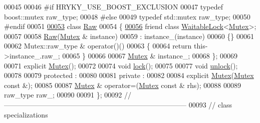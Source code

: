 \begin{DoxyCode}
00045 
00046 \textcolor{preprocessor}{#if HRYKY\_USE\_BOOST\_EXCLUSION}
00047 \textcolor{preprocessor}{}    \textcolor{keyword}{typedef} boost::mutex    raw\_type;
00048 \textcolor{preprocessor}{#else}
00049 \textcolor{preprocessor}{}    \textcolor{keyword}{typedef} std::mutex      raw\_type;
00050 \textcolor{preprocessor}{#endif}
00051 \textcolor{preprocessor}{}
\hypertarget{exclusion__mutex_8h_source_l00053}{}\hyperlink{classhryky_1_1exclusion_1_1_mutex_1_1_raw}{00053}     \textcolor{keyword}{class }\hyperlink{classhryky_1_1exclusion_1_1_mutex_1_1_raw}{Raw}
00054     \{
\hypertarget{exclusion__mutex_8h_source_l00056}{}\hyperlink{classhryky_1_1exclusion_1_1_mutex_1_1_raw_adf91eea431cc875373b8a697c1b9b577}{00056}         \textcolor{keyword}{friend} \textcolor{keyword}{class }\hyperlink{classhryky_1_1exclusion_1_1_waitable_lock}{WaitableLock}<\hyperlink{classhryky_1_1exclusion_1_1_mutex}{Mutex}>;
00057         
00058         \hyperlink{classhryky_1_1exclusion_1_1_mutex_1_1_raw}{Raw}(\hyperlink{classhryky_1_1exclusion_1_1_mutex}{Mutex} & instance)
00059             : instance\_(instance)
00060         \{\}
00061         
00062         Mutex::raw\_type & operator()()
00063         \{
00064             \textcolor{keywordflow}{return} this->instance\_.raw\_;
00065         \}
00066         
00067         \hyperlink{classhryky_1_1exclusion_1_1_mutex}{Mutex} & instance\_;
00068     \};
00069 
00071     \textcolor{keyword}{explicit} \hyperlink{classhryky_1_1exclusion_1_1_mutex_a63cb7e8e5bae0963b1ab3c2712176635}{Mutex}();
00072 
00074     \textcolor{keywordtype}{void} \hyperlink{classhryky_1_1exclusion_1_1_mutex_a6e730d19ff5246bc17ee2ad9f9ae184e}{lock}();
00075 
00077     \textcolor{keywordtype}{void} \hyperlink{classhryky_1_1exclusion_1_1_mutex_a62db408cfde1885ad96dc20f8ed3850a}{unlock}();
00078 
00079 \textcolor{keyword}{protected} :
00080 
00081 \textcolor{keyword}{private} :
00082 
00084     \textcolor{keyword}{explicit} \hyperlink{classhryky_1_1exclusion_1_1_mutex_a63cb7e8e5bae0963b1ab3c2712176635}{Mutex}(\hyperlink{classhryky_1_1exclusion_1_1_mutex_a63cb7e8e5bae0963b1ab3c2712176635}{Mutex} \textcolor{keyword}{const} &);
00085 
00087     \hyperlink{classhryky_1_1exclusion_1_1_mutex_a63cb7e8e5bae0963b1ab3c2712176635}{Mutex} & operator=(\hyperlink{classhryky_1_1exclusion_1_1_mutex_a63cb7e8e5bae0963b1ab3c2712176635}{Mutex} \textcolor{keyword}{const} & rhs);
00088 
00089     raw\_type    raw\_;
00090 
00091 \};
00092 \textcolor{comment}{//
      ------------------------------------------------------------------------------}
00093 \textcolor{comment}{// class specializations}

\end{DoxyCode}
